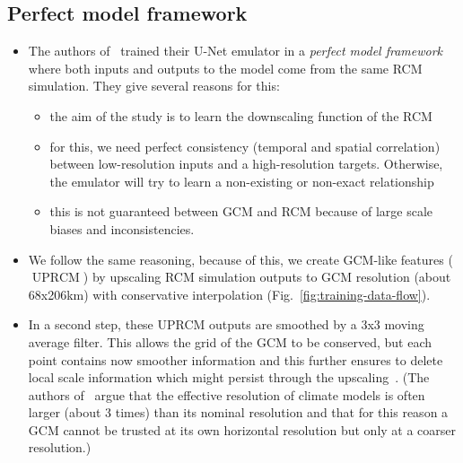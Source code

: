 \documentclass[a4paper,11pt,oneside]{report}
\begin{document}
\subsection{Perfect model framework}
\begin{itemize}
    \item The authors of~\cite{Kittel} trained their U-Net emulator in a \textit{perfect model framework} where both inputs and outputs to the model come from the same RCM simulation. They give several reasons for this: 
    \begin{itemize}
        \item the aim of the study is to learn the downscaling function of the RCM
        \item for this, we need perfect consistency (temporal and spatial correlation) between low-resolution inputs and a high-resolution targets. Otherwise, the emulator will try to learn a non-existing or non-exact relationship
        \item this is not guaranteed between GCM and RCM because of large scale biases and inconsistencies. 
    \end{itemize}
    \item We follow the same reasoning, because of this, we create GCM-like features ($\operatorname{UPRCM}$) by upscaling RCM simulation outputs to GCM resolution (about 68x206km) with conservative interpolation (Fig.~\ref{fig:training-data-flow}). 
    \item In a second step, these UPRCM outputs are smoothed by a 3x3 moving average filter. This allows the grid of the GCM to be conserved, but each point contains now smoother information and this further ensures to delete local scale information which might persist through the upscaling~\cite{Doury, Klaver2020}. (The authors of~\cite{Doury, Klaver2020} argue that the effective resolution of climate models is often larger (about 3 times) than its nominal resolution and that for this reason a GCM cannot be trusted at its own horizontal resolution but only at a coarser resolution.)
\end{itemize}
\end{document}
